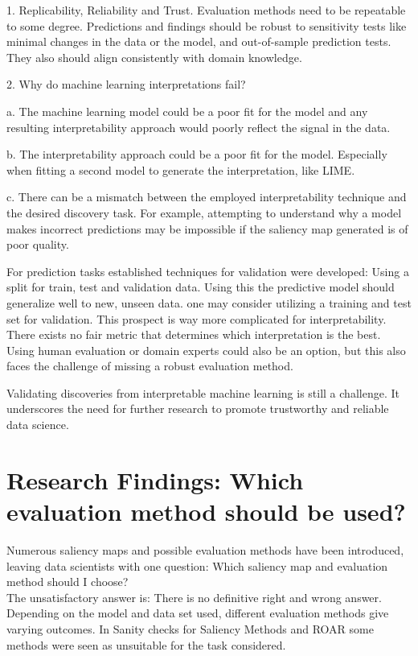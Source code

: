 1. Replicability, Reliability and Trust. Evaluation methods need to be repeatable to some degree. Predictions and findings should be robust to sensitivity tests like minimal changes in the data or the model, and out-of-sample prediction tests. They also should align consistently with domain knowledge. \cite{Meng2020Reproducibility}

2. Why do machine learning interpretations fail?

a. The machine learning model could be a poor fit for the model and any resulting interpretability approach would poorly reflect the signal in the data.

b. The interpretability approach could be a poor fit for the model. Especially when fitting a second model to generate the interpretation, like LIME.

c. There can be a mismatch between the employed interpretability technique and the desired discovery task. For example, attempting to understand why a model makes incorrect predictions may be impossible if the saliency map generated is of poor quality.


For prediction tasks established techniques for validation were developed: Using a split for train, test and validation data. Using this the predictive model should generalize well to new, unseen data. one may consider utilizing a training and test set for validation. \cite{allen2023interpretable} This prospect is way more complicated for interpretability. There exists no fair metric that determines which interpretation is the best. Using human evaluation or domain experts could also be an option, but this also faces the challenge of missing a robust evaluation method.

Validating discoveries from interpretable machine learning is still a challenge. It underscores the need for further research to promote trustworthy and reliable data science.

\chapter{Research Findings: Which evaluation method should be used?}
\label{sec:summary}
Numerous saliency maps and possible evaluation methods have been introduced, leaving data scientists with one question: Which saliency map and evaluation method should I choose?
\\
The unsatisfactory answer is: There is no definitive right and wrong answer. Depending on the model and data set used, different evaluation methods give varying outcomes. In Sanity checks for Saliency Methods \cite{adebayo2020sanity} and ROAR\cite{hooker2019benchmark} some methods were seen as unsuitable for the task considered.

